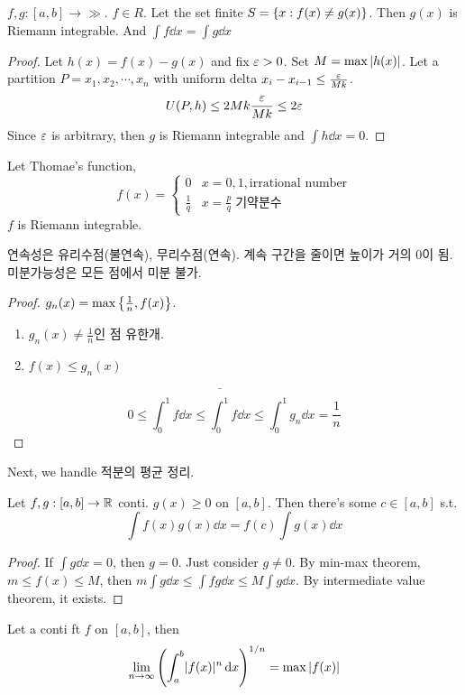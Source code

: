 \documentclass{article}
\begin{document}
\begin{proposition}
    $f,g : [a,b]\to \gg$. $f \in R$. Let the set finite $S=\left\{ x: f(x) \neq g(x) \right\}$. Then $g(x)$ is Riemann integrable. And $\int f \dd x = \int g \dd x$
\end{proposition}

\begin{proof}
    Let $h(x)=f(x)-g(x)$ and fix $\varepsilon > 0$. Set $M=\max{\lvert h(x)\rvert}$. Let a partition $P={x_1, x_2, \cdots, x_n}$ with uniform delta $x_i - x_{i-1} \leq \frac{\varepsilon}{Mk}$. 
    \[U(P,h)\leq 2Mk\frac{\varepsilon}{Mk}\leq 2\varepsilon \]
    Since $\varepsilon$ is arbitrary, then $g$ is Riemann integrable and $\int h\dd x = 0$.
\end{proof}

\begin{proposition}
    Let Thomae's function, \[f(x)=\begin{cases}
        0 & x=0,1,\text{irrational number} \\
        \frac{1}{q} & x=\frac{p}{q} \; \text{기약분수} 
    \end{cases}\]
    $f$ is Riemann integrable.
\end{proposition}

연속성은 유리수점(불연속), 무리수점(연속). 계속 구간을 줄이면 높이가 거의 0이 됨. 미분가능성은 모든 점에서 미분 불가.

\begin{proof}
    $g_n(x)=\max\left\{ \frac{1}{n}, f(x) \right\}$.
    \begin{enumerate}
        \item $g_n(x)\neq\frac{1}{n}$인 점 유한개. 
        \item $f(x) \leq g_n(x)$
    \end{enumerate}
    \[0 \leq \int^1_0f\dd x \leq \bar{\int^1_0}f \dd x \leq \int^1_0 g_n \dd x=\frac{1}{n}\]
\end{proof}

Next, we handle 적분의 평균 정리.

\begin{proposition}
    Let $f,g: [a,b]\to\mathbb{R}$ conti. $g(x) \geq 0$ on $[a,b]$. Then there's some $c \in [a,b]$ s.t.
    \[\int f(x)g(x)\dd x = f(c) \int g(x)\dd x\]
\end{proposition}

\begin{proof}
    If $\int g \dd x = 0$, then $g=0$. Just consider $g \neq 0$. By min-max theorem, $m \leq f(x) \leq M$, then $m \int g \dd x \leq \int fg \dd x \leq M \int g \dd x$. By intermediate value theorem, it exists.
\end{proof}

\begin{proposition}
    Let a conti ft $f$ on $[a,b]$, then
    \[\lim_{n \to \infty} \left(\int^b_a \lvert f(x)\rvert^n\,\mathrm{d} x \right)^{1/n} = \max{\lvert f(x)\rvert}\]
\end{proposition}
\end{document}

